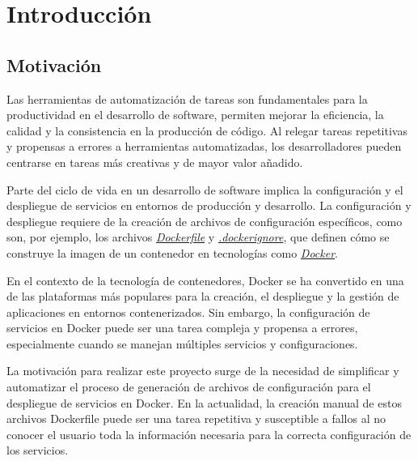 \documentclass[12pt, a4paper, twoside]{article}
\begin{document}

\newpage




\newpage


\newpage

\tableofcontents
\newpage












\section{Introducción}
\label{sec:Introduccion}

\subsection{Motivación}
Las herramientas de automatización de tareas son fundamentales para la productividad en el desarrollo de software, permiten mejorar la eficiencia, la calidad y la consistencia en la producción de código.
Al relegar tareas repetitivas y propensas a errores a herramientas automatizadas, los desarrolladores pueden centrarse en tareas más creativas y de mayor valor añadido.

Parte del ciclo de vida en un desarrollo de software implica la configuración y el despliegue de servicios en entornos de producción y desarrollo.
La configuración y despliegue requiere de la creación de archivos de configuración específicos, como son, por ejemplo, los archivos \hyperref[sec:Dockerfile]{\emph{Dockerfile}} y \hyperref[sec:dockerignore]{\emph{.dockerignore}}, que definen cómo se construye la imagen de un contenedor en tecnologías como \hyperref[sec:Docker]{\emph{Docker}}.

En el contexto de la tecnología de contenedores, Docker se ha convertido en una de las plataformas más populares para la creación, el despliegue y la gestión de aplicaciones en entornos contenerizados. 
Sin embargo, la configuración de servicios en Docker puede ser una tarea compleja y propensa a errores, especialmente cuando se manejan múltiples servicios y configuraciones.

La motivación para realizar este proyecto surge de la necesidad de simplificar y automatizar el proceso de generación de archivos de configuración para el despliegue de servicios en Docker. 
En la actualidad, la creación manual de estos archivos Dockerfile puede ser una tarea repetitiva y susceptible a fallos al no conocer el usuario toda la información necesaria para la correcta configuración de los servicios.
\end{document}
